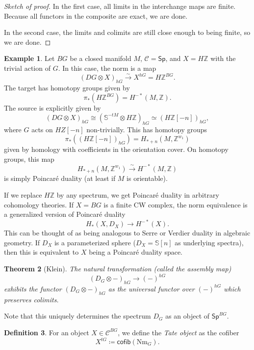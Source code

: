 \documentclass[10pt, oneside]{memoir}
\newtheorem{thm}{Theorem}[subsection]
\theoremstyle{definition}
\newtheorem{defn}[thm]{Definition}
\newtheorem{exm}[thm]{Example}
\theoremstyle{remark}
\theoremstyle{plain}
\theoremstyle{definition}
\theoremstyle{remark}
\newcommand{\Z}{\mathbb{Z}}
\newcommand{\bS}{\mathbb{S}}
\newcommand{\mc}[1]{\mathcal{#1}}
\newcommand{\mr}[1]{\mathrm{#1}}
\newcommand{\ms}[1]{\mathsf{#1}}
\newcommand{\1}{\mathbf{1}}
\newcommand{\2}{\mathbf{2}}
\newcommand{\3}{\mathbf{3}}
\begin{document}
\begin{proof}[Sketch of proof]
    In the first case, all limits in the interchange maps are finite. Because all functors in the composite are exact, we are done.

    In the second case, the limits and colimits are still close enough to being finite, so we are done.
\end{proof}

\begin{exm}
    Let $BG$ be a closed manifold $M$, $\mc{C} = \ms{Sp}$, and $X = H\Z$ with the trivial action of $G$. In this case, the norm is a map
    \[ (DG \otimes X)_{hG} \xrightarrow{\sim} X^{hG} = H\Z^{BG}. \]
    The target has homotopy groups given by
    \[ \pi_* (H\Z^{BG}) = H^{-*}(M, \Z). \]
    The source is explicitly given by
    \[ (DG \otimes X)_{hG} \cong (\bS^{-tM} \otimes H\Z)_{hG} \simeq (H\Z[-n])_{hG}, \]
    where $G$ acts on $HZ[-n]$ non-trivially. This has homotopy groups
    \[ \pi_*((H\Z[-n])_{hG}) = H_{*+n}(M, \Z^{w_1}) \]
    given by homology with coefficients in the orientation cover. On homotopy groups, this map
    \[ H_{*+n}(M, \Z^{w_1}) \xrightarrow{\sim} H^{-*}(M, \Z) \]
    is simply Poincar\'e duality (at least if $M$ is orientable).
\end{exm}

If we replace $H\Z$ by any spectrum, we get Poincar\'e duality in arbitrary cohomology theories. If $X = BG$ is a finite CW complex, the norm equivalence is a generalized version of Poincar\'e duality
\[ H_*(X, D_X) \to H^{-*}(X). \]
This can be thought of as being analogous to Serre or Verdier duality in algebraic geometry. If $D_X$ is a parameterized sphere ($D_X = \bS[n]$ as underlying spectra), then this is equivalent to $X$ being a Poincar\'e duality space.

\begin{thm}[Klein]
    The natural transformation (called the \textit{assembly map})
    \[ (D_G \otimes -)_{hG} \to (-)^{hG} \]
    exhibits the functor $(D_G \otimes -)_{hG}$ as the universal functor over $(-)^{hG}$ which preserves colimits.
\end{thm}

Note that this uniquely determines the spectrum $D_G$ as an object of $\ms{Sp}^{BG}$.

\begin{defn}
    For an object $X \in \mc{C}^{BG}$, we define the \textit{Tate object} as the cofiber
    \[ X^{tG} \coloneqq \ms{cofib}(\mr{Nm}_G). \]
\end{defn}
\end{document}
